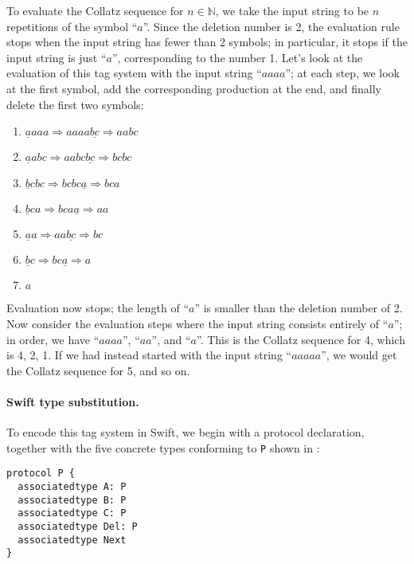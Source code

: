\documentclass[../generics]{subfiles}
\begin{document}
To evaluate the Collatz sequence for $n\in\mathbb{N}$, we take the input string to be $n$ repetitions of the symbol ``$a$''. Since the deletion number is 2, the evaluation rule stops when the input string has fewer than 2 symbols; in particular, it stops if the input string is just ``$a$'', corresponding to the number 1. Let's look at the evaluation of this tag system with the input string ``$aaaa$''; at each step, we look at the first symbol, add the corresponding production at the end, and finally delete the first two symbols:
\begin{enumerate}
\item $\underline{a}aaa \Rightarrow aaaa\underline{bc} \Rightarrow aabc$
\item $\underline{a}abc \Rightarrow aabc\underline{bc} \Rightarrow bcbc$
\item $\underline{b}cbc \Rightarrow bcbc\underline{a} \Rightarrow bca$
\item $\underline{b}ca \Rightarrow bca\underline{a} \Rightarrow aa$
\item $\underline{a}a \Rightarrow aa\underline{bc} \Rightarrow bc$
\item $\underline{b}c \Rightarrow bc\underline{a} \Rightarrow a$
\item $a$
\end{enumerate}
Evaluation now stops; the length of ``$a$'' is smaller than the deletion number of 2. Now consider the evaluation steps where the input string consists entirely of ``$a$''; in order, we have ``$aaaa$'', ``$aa$'', and ``$a$''. This is the Collatz sequence for 4, which is 4, 2, 1. If we had instead started with the input string ``$aaaaa$'', we would get the Collatz sequence for 5, and so on.

\paragraph{Swift type substitution.}
To encode this tag system in Swift, we begin with a protocol declaration, together with the five concrete types conforming to \texttt{P} shown in :
\begin{Verbatim}
protocol P {
  associatedtype A: P
  associatedtype B: P
  associatedtype C: P
  associatedtype Del: P
  associatedtype Next
}
\end{Verbatim}
\end{document}
